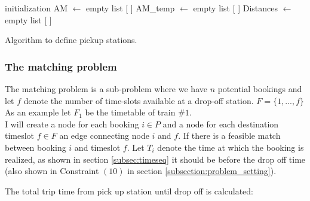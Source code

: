 \documentclass{article}
\begin{document}
\begin{algorithm}[H]
\label{alg:pickup_station}
\SetAlgoLined
\LinesNumbered
{}
\BlankLine
 initialization\;
AM $\leftarrow$ empty list [ ]\;
AM\_temp $\leftarrow$ empty list [ ]\;
Distances $\leftarrow$ empty list [ ]\;
\caption{Algorithm to define pickup stations.}
\end{algorithm}



\subsubsection{The matching problem}
\label{subsec:matching-prob}

The matching problem is a sub-problem where we have $n$ potential bookings and let $f$ denote the number of time-slots available at a drop-off station. $F = \{ 1, ..., f \}$ As an example let $F_1$ be the timetable of train $\#1$.\\
I will create a node for each booking $i \in P$ and a node for each destination timeslot $f \in F$ an edge connecting node $i$ and $f$. If there is a feasible match between booking $i$ and timeslot $f$. 
Let $T_i$ denote the time at which the booking is realized, as shown in section \ref{subsec:timeseq} it should be before the drop off time (also shown in Constraint $(10)$ in section \ref{subsection:problem_setting}).

The total trip time from pick up station until drop off is calculated:
 
\end{document}

